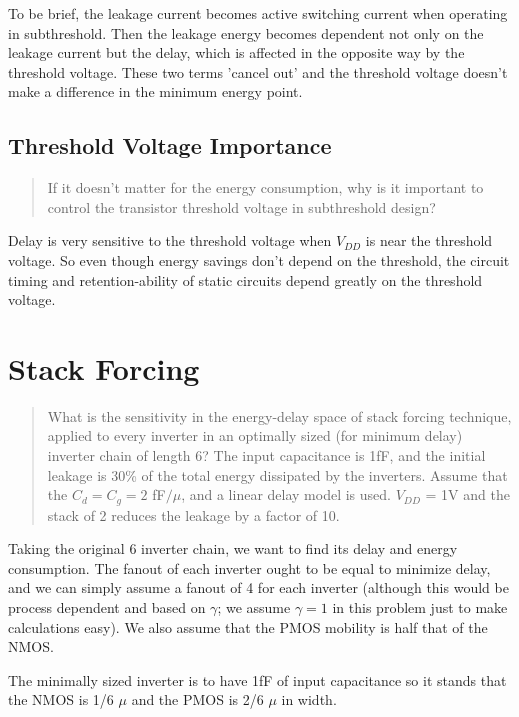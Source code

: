 \documentclass[11pt]{article}
\begin{document}
To be brief, the leakage current becomes active switching current when operating in subthreshold. Then the leakage energy becomes dependent not only on the leakage current but the delay, which is affected in the opposite way by the threshold voltage. These two terms 'cancel out' and the threshold voltage doesn't make a difference in the minimum energy point.

\subsection{Threshold Voltage Importance}
\begin{quote}
	If it doesn't matter for the energy consumption, why is it important to control the transistor threshold voltage in subthreshold design?
\end{quote}

Delay is very sensitive to the threshold voltage when $V_{DD}$ is near the threshold voltage. So even though energy savings don't depend on the threshold, the circuit timing and retention-ability of static circuits depend greatly on the threshold voltage.

\section{Stack Forcing}
\begin{quote}
	What is the sensitivity in the energy-delay space of stack forcing technique, applied to every inverter in an optimally sized (for minimum delay) inverter chain of length 6? The input capacitance is 1fF, and the initial leakage is 30\% of the total energy dissipated by the inverters. Assume that the $C_{d} = C_{g} = 2$ fF$/\mu$, and a linear delay model is used. $V_{DD}$ = 1V and the stack of 2 reduces the leakage by a factor of 10.
\end{quote}

Taking the original 6 inverter chain, we want to find its delay and energy consumption. The fanout of each inverter ought to be equal to minimize delay, and we can simply assume a fanout of 4 for each inverter (although this would be process dependent and based on $\gamma$; we assume $\gamma = 1$ in this problem just to make calculations easy). We also assume that the PMOS mobility is half that of the NMOS.

The minimally sized inverter is to have 1fF of input capacitance so it stands that the NMOS is 1/6 $\mu$ and the PMOS is 2/6 $\mu$ in width.
\end{document}
